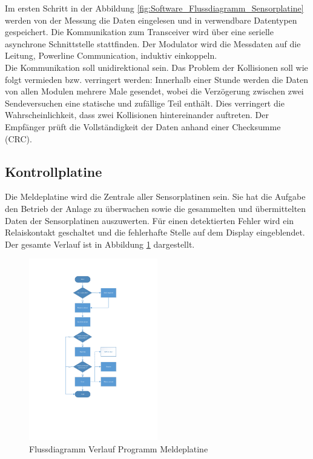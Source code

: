 Im ersten Schritt in der Abbildung \ref{fig:Software_Flussdiagramm_Sensorplatine} werden von der Messung die Daten eingelesen und in verwendbare Datentypen gespeichert. Die Kommunikation zum Transceiver wird über eine serielle asynchrone Schnittstelle stattfinden. Der Modulator wird die Messdaten auf die Leitung, Powerline Communication, induktiv einkoppeln. \\ Die Kommunikation soll unidirektional sein. Das Problem der Kollisionen soll wie folgt vermieden bzw. verringert werden: Innerhalb einer Stunde werden die Daten von allen Modulen mehrere Male gesendet, wobei die Verzögerung zwischen zwei Sendeversuchen eine statische und zufällige Teil enthält. Dies verringert die Wahrscheinlichkeit, dass zwei Kollisionen hintereinander auftreten.
Der Empfänger prüft die Vollständigkeit der Daten anhand einer Checksumme (CRC).

\subsection{Kontrollplatine}
Die Meldeplatine wird die Zentrale aller Sensorplatinen sein. Sie hat die Aufgabe den Betrieb der Anlage zu überwachen sowie die gesammelten und übermittelten Daten der Sensorplatinen auszuwerten. Für einen detektierten Fehler wird ein Relaiskontakt geschaltet und die fehlerhafte Stelle auf dem Display eingeblendet. Der gesamte Verlauf ist in Abbildung \ref{fig:Scheme_report_board} dargestellt.

\begin{figure}[h!] 
  \centering
     \includegraphics[width=0.5\textwidth]{graphics/Scheme_report_board}
  \caption{Flussdiagramm Verlauf Programm Meldeplatine}
  \label{fig:Scheme_report_board}
\end{figure}

